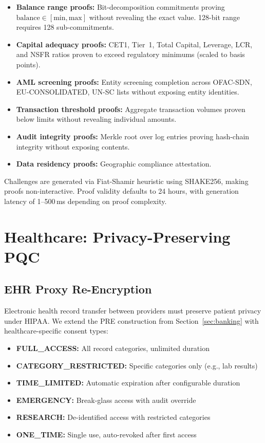 \documentclass[conference,10pt]{IEEEtran}
\newcommand{\shake}{\textsf{SHAKE256}}
\begin{document}
\begin{itemize}
    \item \textbf{Balance range proofs:} Bit-decomposition commitments proving $\text{balance} \in [\text{min}, \text{max}]$ without revealing the exact value. 128-bit range requires 128 sub-commitments.
    \item \textbf{Capital adequacy proofs:} CET1, Tier~1, Total Capital, Leverage, LCR, and NSFR ratios proven to exceed regulatory minimums (scaled to basis points).
    \item \textbf{AML screening proofs:} Entity screening completion across OFAC-SDN, EU-CONSOLIDATED, UN-SC lists without exposing entity identities.
    \item \textbf{Transaction threshold proofs:} Aggregate transaction volumes proven below limits without revealing individual amounts.
    \item \textbf{Audit integrity proofs:} Merkle root over log entries proving hash-chain integrity without exposing contents.
    \item \textbf{Data residency proofs:} Geographic compliance attestation.
\end{itemize}

Challenges are generated via Fiat-Shamir heuristic using \shake{}, making proofs non-interactive. Proof validity defaults to 24 hours, with generation latency of 1--500\,ms depending on proof complexity.

\section{Healthcare: Privacy-Preserving PQC}
\label{sec:healthcare}

\subsection{EHR Proxy Re-Encryption}

Electronic health record transfer between providers must preserve patient privacy under HIPAA. We extend the PRE construction from Section~\ref{sec:banking} with healthcare-specific consent types:

\begin{itemize}
    \item \textbf{FULL\_ACCESS:} All record categories, unlimited duration
    \item \textbf{CATEGORY\_RESTRICTED:} Specific categories only (e.g., lab results)
    \item \textbf{TIME\_LIMITED:} Automatic expiration after configurable duration
    \item \textbf{EMERGENCY:} Break-glass access with audit override
    \item \textbf{RESEARCH:} De-identified access with restricted categories
    \item \textbf{ONE\_TIME:} Single use, auto-revoked after first access
\end{itemize}
\end{document}
